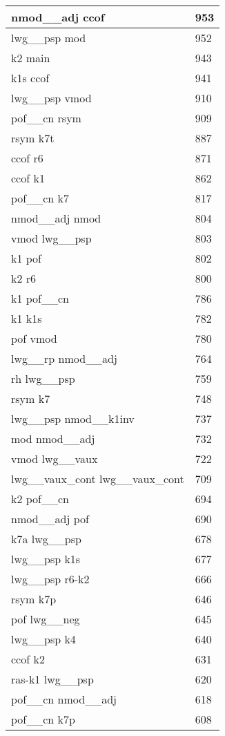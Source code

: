 \documentclass[a4 paper]{article}
\begin{document}
\begin{longtable}{p{}p{}}
nmod\_\_adj ccof  & 953 \\ \midrule
lwg\_\_psp mod  & 952 \\ \midrule
k2 main  & 943 \\ \midrule
k1s ccof  & 941 \\ \midrule
lwg\_\_psp vmod  & 910 \\ \midrule
pof\_\_cn rsym  & 909 \\ \midrule
rsym k7t  & 887 \\ \midrule
ccof r6  & 871 \\ \midrule
ccof k1  & 862 \\ \midrule
pof\_\_cn k7  & 817 \\ \midrule
nmod\_\_adj nmod  & 804 \\ \midrule
vmod lwg\_\_psp  & 803 \\ \midrule
k1 pof  & 802 \\ \midrule
k2 r6  & 800 \\ \midrule
k1 pof\_\_cn  & 786 \\ \midrule
k1 k1s  & 782 \\ \midrule
pof vmod  & 780 \\ \midrule
lwg\_\_rp nmod\_\_adj  & 764 \\ \midrule
rh lwg\_\_psp  & 759 \\ \midrule
rsym k7  & 748 \\ \midrule
lwg\_\_psp nmod\_\_k1inv  & 737 \\ \midrule
mod nmod\_\_adj  & 732 \\ \midrule
vmod lwg\_\_vaux  & 722 \\ \midrule
lwg\_\_vaux\_cont lwg\_\_vaux\_cont  & 709 \\ \midrule
k2 pof\_\_cn  & 694 \\ \midrule
nmod\_\_adj pof  & 690 \\ \midrule
k7a lwg\_\_psp  & 678 \\ \midrule
lwg\_\_psp k1s  & 677 \\ \midrule
lwg\_\_psp r6-k2  & 666 \\ \midrule
rsym k7p  & 646 \\ \midrule
pof lwg\_\_neg  & 645 \\ \midrule
lwg\_\_psp k4  & 640 \\ \midrule
ccof k2  & 631 \\ \midrule
ras-k1 lwg\_\_psp  & 620 \\ \midrule
pof\_\_cn nmod\_\_adj  & 618 \\ \midrule
pof\_\_cn k7p  & 608 \\ \midrule

\end{longtable}
\end{document}
